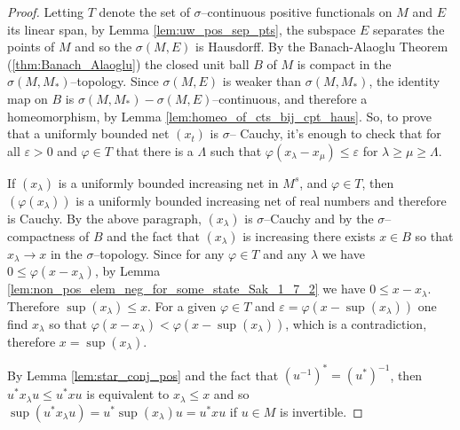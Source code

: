 \begin{proof}
  \leanok
  Letting $T$ denote the set of $\sigma$--continuous positive functionals on $M$ and $E$ its linear span, by
  Lemma \ref{lem:uw_pos_sep_pts}, the subspace $E$ separates the points of $M$ and so the $\sigma(M,E)$
  is Hausdorff. By the Banach-Alaoglu Theorem (\ref{thm:Banach_Alaoglu}) the closed unit ball $B$ of $M$ is
  compact in the $\sigma(M,M_{*})$--topology. Since $\sigma(M,E)$ is weaker than $\sigma(M,M_{*})$, the identity
  map on $B$ is $\sigma(M,M_{*})-\sigma(M,E)$--continuous, and therefore a homeomorphism,
  by Lemma \ref{lem:homeo_of_cts_bij_cpt_haus}. So, to prove that a uniformly bounded net $(x_{t})$ is $\sigma$--
  Cauchy, it's enough to check that for all $\varepsilon>0$ and $\varphi\in T$ that there is a $\Lambda$ such that
  $\varphi(x_{\lambda}-x_{\mu})\le \varepsilon$ for $\lambda \ge \mu \ge \Lambda$.

  If $(x_{\lambda})$ is a uniformly bounded increasing net in $M^{s}$, and $\varphi\in T$, then $(\varphi(x_{\lambda}))$ is
  a uniformly bounded increasing net of real numbers and therefore is Cauchy. By the above paragraph, $(x_{\lambda})$ is
  $\sigma$--Cauchy and by the $\sigma$--compactness of $B$ and the fact that $(x_{\lambda})$ is increasing there exists $x\in B$
  so that $x_{\lambda} \to x$ in the $\sigma$--topology. Since for any $\varphi\in T$ and any $\lambda$ we have
  $0 \le \varphi(x-x_{\lambda})$, by Lemma \ref{lem:non_pos_elem_neg_for_some_state_Sak_1_7_2} we have $0\le x - x_{\lambda}$.
  Therefore $\sup(x_{\lambda})\le x$. For a given $\varphi\in T$ and $\varepsilon = \varphi(x-\sup(x_{\lambda}))$ one find
  $x_{\lambda}$ so that $\varphi(x-x_{\lambda})<\varphi (x - \sup(x_{\lambda}))$, which is a contradiction, therefore $x=\sup(x_{\lambda})$.

  By Lemma \ref{lem:star_conj_pos} and the fact that $(u^{-1})^{*}=(u^{*})^{-1}$, then $u^{*}x_{\lambda}u\le u^{*}xu$
  is equivalent to $x_{\lambda}\le x$ and so $\sup(u^{*}x_{\lambda}u)=u^{*}\sup(x_{\lambda})u=u^{*}xu$ if $u\in M$ is invertible.


\end{proof}
